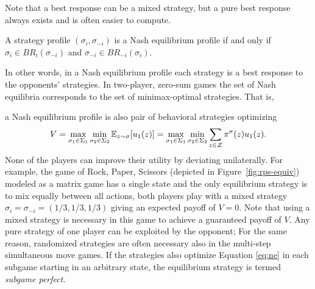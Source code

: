 {Note that a best response can be a mixed strategy, but a pure best response always exists and is often easier to compute.

\begin{definition}
A strategy profile $(\sigma_i, \sigma_{-i})$ is a Nash equilibrium profile if and only if $\sigma_i \in BR_i(\sigma_{-i})$
and $\sigma_{-i} \in BR_{-i}(\sigma_i)$.
\end{definition}

In other words, in a Nash equilibrium profile each strategy is a best response to the opponents' strategies. In two-player, zero-sum
games the set of Nash equilibria corresponds to the set of minimax-optimal strategies. That is,} a Nash equilibrium profile is
also pair of behavioral strategies optimizing
\begin{equation}\label{eq:ne}
V = \max_{\sigma_1 \in \Sigma_1} \min_{\sigma_2 \in \Sigma_2} \mathbb{E}_{z \sim \sigma}[u_1(z)]
  = \max_{\sigma_1 \in \Sigma_1} \min_{\sigma_2 \in \Sigma_2} \sum_{z \in \mathcal{Z}} \pi^\sigma(z) u_1(z).
\end{equation}
None of the players can improve their utility by deviating unilaterally.
For example, the game of Rock, Paper, Scissors (depicted in Figure~\ref{fig:rps-equiv}) modeled as a matrix game has a single state and the only equilibrium strategy is to mix equally between
all actions, \ie both players play with a mixed strategy $\sigma_i = \sigma_{-i} = (1/3, 1/3, 1/3)$ giving an expected payoff of
$V = 0$.
Note that using a mixed strategy is necessary in this game to achieve a guaranteed payoff of $V$.
Any pure strategy of one player can be exploited by the opponent; 
For the same reason, randomized strategies are often necessary also in the multi-step simultaneous move games.
If the strategies also optimize Equation \ref{eq:ne} in each subgame starting in an arbitrary state, the equilibrium strategy
is termed {\it subgame perfect.}

